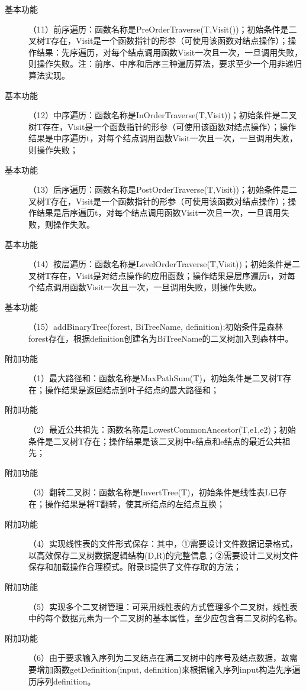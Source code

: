 \documentclass[supercite]{Experimental_Report}
\theoremstyle{definition}
\begin{document}
\begin{description}
	\item[基本功能] （11）前序遍历：函数名称是PreOrderTraverse(T,Visit())；初始条件是二叉树T存在，Visit是一个函数指针的形参（可使用该函数对结点操作）；操作结果：先序遍历，对每个结点调用函数Visit一次且一次，一旦调用失败，则操作失败。注：前序、中序和后序三种遍历算法，要求至少一个用非递归算法实现。
	\item[基本功能] （12）中序遍历：函数名称是InOrderTraverse(T,Visit))；初始条件是二叉树T存在，Visit是一个函数指针的形参（可使用该函数对结点操作）；操作结果是中序遍历t，对每个结点调用函数Visit一次且一次，一旦调用失败，则操作失败；
	\item[基本功能] （13）后序遍历：函数名称是PostOrderTraverse(T,Visit))；初始条件是二叉树T存在，Visit是一个函数指针的形参（可使用该函数对结点操作）；操作结果是后序遍历t，对每个结点调用函数Visit一次且一次，一旦调用失败，则操作失败。
	\item[基本功能] （14）按层遍历：函数名称是LevelOrderTraverse(T,Visit))；初始条件是二叉树T存在，Visit是对结点操作的应用函数；操作结果是层序遍历t，对每个结点调用函数Visit一次且一次，一旦调用失败，则操作失败。
	\item[基本功能] （15）addBinaryTree(forest, BiTreeName, definition);初始条件是森林forest存在，根据definition创建名为BiTreeName的二叉树加入到森林中。\\
	\item[附加功能] （1）最大路径和：函数名称是MaxPathSum(T)，初始条件是二叉树T存在；操作结果是返回结点到叶子结点的最大路径和；
	\item[附加功能] （2）最近公共祖先：函数名称是LowestCommonAncestor(T,e1,e2)；初始条件是二叉树T存在；操作结果是该二叉树中e结点和e结点的最近公共祖先；
	\item[附加功能] （3）翻转二叉树：函数名称是InvertTree(T)，初始条件是线性表L已存在；操作结果是将T翻转，使其所结点的左结点互换；
	\item[附加功能] （4）实现线性表的文件形式保存：其中，①需要设计文件数据记录格式，以高效保存二叉树数据逻辑结构(D,{R})的完整信息；②需要设计二叉树文件保存和加载操作合理模式。附录B提供了文件存取的方法；
	\item[附加功能] （5）实现多个二叉树管理：可采用线性表的方式管理多个二叉树，线性表中的每个数据元素为一个二叉树的基本属性，至少应包含有二叉树的名称。
 	\item[附加功能] （6）由于要求输入序列为二叉结点在满二叉树中的序号及结点数据，故需要增加函数getDefinition(input, definition)来根据输入序列input构造先序遍历序列definition。 
\end{description}
\end{document}
